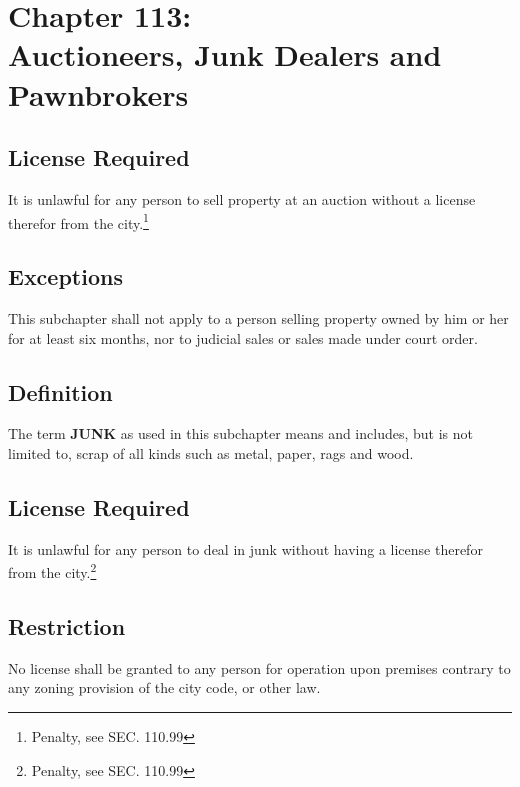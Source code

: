 \chapter*{Chapter 113: \\
	Auctioneers, Junk Dealers and Pawnbrokers}
    \vfill
    \minitoc
    \pagebreak


\section{License Required}
It is unlawful for any person to sell property at an auction without a license therefor from the city.\footnote{Penalty, see SEC. 110.99}

\section{Exceptions}
This subchapter shall not apply to a person selling property owned by him or her for at least six months, nor to judicial sales or sales made under court order.


\setcounter{section}{14}
\section{Definition}
The term \textbf{JUNK} as used in this subchapter means and includes, but is not limited to, scrap of all kinds such as metal, paper, rags and wood.

\section{License Required}
It is unlawful for any person to deal in junk without having a license therefor from the city.\footnote{Penalty, see SEC. 110.99}

\section{Restriction}
No license shall be granted to any person for operation upon premises contrary to any zoning provision of the city code, or other law.

